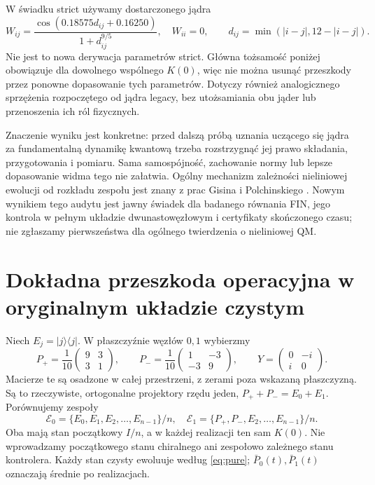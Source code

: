 \documentclass[11pt,a4paper]{article}
\begin{document}
W świadku strict używamy dostarczonego jądra
\begin{equation}\label{eq:strict}
 W_{ij}=\frac{\cos(0.18575d_{ij}+0.16250)}{1+d_{ij}^{9/5}},\quad
 W_{ii}=0,\qquad d_{ij}=\min(|i-j|,12-|i-j|).
\end{equation}
Nie jest to nowa derywacja parametrów strict. Główna tożsamość poniżej
obowiązuje dla dowolnego wspólnego $K(0)$, więc nie można usunąć
przeszkody przez ponowne dopasowanie tych parametrów. Dotyczy również
analogicznego sprzężenia rozpoczętego od jądra legacy, bez utożsamiania
obu jąder lub przenoszenia ich ról fizycznych.

Znaczenie wyniku jest konkretne: przed dalszą próbą uznania uczącego się
jądra za fundamentalną dynamikę kwantową trzeba rozstrzygnąć jej prawo
składania, przygotowania i pomiaru. Sama samospójność, zachowanie normy
lub lepsze dopasowanie widma tego nie załatwia. Ogólny mechanizm
zależności nieliniowej ewolucji od rozkładu zespołu jest znany z prac
Gisina i Polchinskiego \cite{Gisin1990,Polchinski1991}. Nowym wynikiem
tego audytu jest jawny świadek dla badanego równania FIN, jego kontrola
w pełnym układzie dwunastowęzłowym i certyfikaty skończonego czasu;
nie zgłaszamy pierwszeństwa dla ogólnego twierdzenia o nieliniowej QM.

\section{Dokładna przeszkoda operacyjna w oryginalnym układzie czystym}

Niech $E_j=|j\rangle\langle j|$. W płaszczyźnie węzłów $0,1$ wybierzmy
\begin{equation}\label{eq:projectors}
 P_+=\frac1{10}\begin{pmatrix}9&3\\3&1\end{pmatrix},\qquad
 P_-=\frac1{10}\begin{pmatrix}1&-3\\-3&9\end{pmatrix},\qquad
 Y=\begin{pmatrix}0&-i\\i&0\end{pmatrix}.
\end{equation}
Macierze te są osadzone w całej przestrzeni, z zerami poza wskazaną
płaszczyzną. Są to rzeczywiste, ortogonalne projektory rzędu jeden,
$P_++P_-=E_0+E_1$. Porównujemy zespoły
\begin{equation}\label{eq:ensembles}
 \mathcal E_0=\{E_0,E_1,E_2,\ldots,E_{n-1}\}/n,
 \quad
 \mathcal E_1=\{P_+,P_-,E_2,\ldots,E_{n-1}\}/n.
\end{equation}
Oba mają stan początkowy $I/n$, a w każdej realizacji ten sam $K(0)$.
Nie wprowadzamy początkowego stanu chiralnego ani zespołowo zależnego
stanu kontrolera. Każdy stan czysty ewoluuje według \eqref{eq:pure};
$\bar P_0(t),\bar P_1(t)$ oznaczają średnie po realizacjach.
\end{document}
